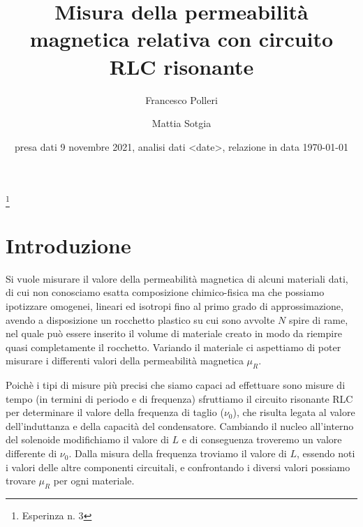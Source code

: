 \documentclass[
    rmp,
    reprint, 
    superscriptaddress, 
    altaffilletter, 
    amsmath, 
    amssymb, 
    a4paper]{revtex4-2}
\begin{document}
\title{Misura della permeabilità magnetica relativa con circuito RLC risonante
}
\thanks{Esperinza n. 3
}

\author{Francesco Polleri}
\author{Mattia Sotgia}


\date{presa dati
    9 novembre 2021, analisi dati <date>, relazione in data 
    \today
}

\begin{abstract}
    
\end{abstract}
\maketitle
\thispagestyle{fancy}


\section{Introduzione}
Si vuole misurare il valore della permeabilità magnetica di alcuni materiali dati, di cui non conosciamo esatta composizione chimico-fisica ma che possiamo ipotizzare omogenei, lineari ed isotropi fino al primo grado di approssimazione, avendo a disposizione un rocchetto plastico su cui sono avvolte $N$ spire di rame, nel quale può essere inserito il volume di materiale creato in modo da riempire quasi completamente il rocchetto. Variando il materiale ci aspettiamo di poter misurare i differenti valori della permeabilità magnetica $\mu_R$. 

Poichè i tipi di misure più precisi che siamo capaci ad effettuare sono misure di tempo (in termini di periodo e di frequenza) sfruttiamo il circuito risonante RLC per determinare il valore della frequenza di taglio ($\nu_0$), che risulta legata al valore dell'induttanza e della capacità del condensatore. Cambiando il nucleo all'interno del solenoide modifichiamo il valore di $L$ e di conseguenza troveremo un valore differente di $\nu_0$. Dalla misura della frequenza troviamo il valore di $L$, essendo noti i valori delle altre componenti circuitali, e confrontando i diversi valori possiamo trovare $\mu_R$ per ogni materiale.
\end{document}
